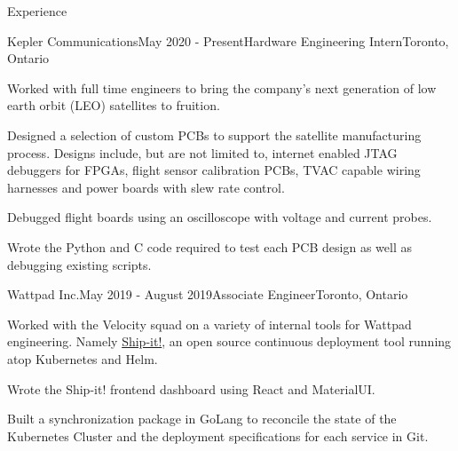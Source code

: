 \documentclass{resume} %
\begin{document}
\begin{rSection}{Experience}

\begin{rSubsection}{Kepler Communications}{May 2020 - Present}{Hardware
    Engineering Intern}{Toronto, Ontario}
\item Worked with full time engineers to bring the company's next generation of
  low earth orbit (LEO) satellites to fruition.
\item Designed a selection of custom PCBs to support the satellite manufacturing
  process. Designs include, but are not limited to, internet enabled JTAG
  debuggers for FPGAs, flight sensor calibration PCBs, TVAC capable wiring
  harnesses and power boards with slew rate control.
\item Debugged flight boards using an oscilloscope with voltage
  and current probes.
\item Wrote the Python and C code required to test each PCB design as well as
  debugging existing scripts.
\end{rSubsection}


\begin{rSubsection}{Wattpad Inc.}{May 2019 - August 2019}{Associate
    Engineer}{Toronto, Ontario}
\item Worked with the Velocity squad on a variety of internal tools for Wattpad engineering.
  Namely \href{https://github.com/Wattpad/ship-it}{Ship-it!}, an open source continuous deployment tool running atop Kubernetes and
  Helm.
\item Wrote the Ship-it! frontend dashboard using React and MaterialUI.
\item Built a synchronization package in GoLang to reconcile the state of the
  Kubernetes Cluster and the deployment specifications for each service in Git.
\end{rSubsection}



\end{rSection}
\end{document}

